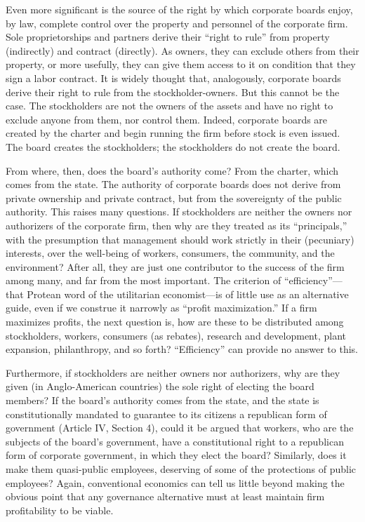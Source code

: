 \documentclass[
]{book}
\begin{document}
Even more significant is the source of the right by which corporate boards enjoy, by law, complete control over the property and personnel of the corporate firm. Sole proprietorships and partners derive their ``right to rule'' from property (indirectly) and contract (directly). As owners, they can exclude others from their property, or more usefully, they can give them access to it on condition that they sign a labor contract. It is widely thought that, analogously, corporate boards derive their right to rule from the stockholder-owners. But this cannot be the case. The stockholders are not the owners of the assets and have no right to exclude anyone from them, nor control them. Indeed, corporate boards are created by the charter and begin running the firm before stock is even issued. The board creates the stockholders; the stockholders do not create the board.

From where, then, does the board's authority come? From the charter, which comes from the state. The authority of corporate boards does not derive from private ownership and private contract, but from the sovereignty of the public authority. This raises many questions. If stockholders are neither the owners nor authorizers of the corporate firm, then why are they treated as its ``principals,'' with the presumption that management should work strictly in their (pecuniary) interests, over the well-being of workers, consumers, the community, and the environment? After all, they are just one contributor to the success of the firm among many, and far from the most important. The criterion of ``efficiency''---that Protean word of the utilitarian economist---is of little use as an alternative guide, even if we construe it narrowly as ``profit maximization.'' If a firm maximizes profits, the next question is, how are these to be distributed among stockholders, workers, consumers (as rebates), research and development, plant expansion, philanthropy, and so forth? ``Efficiency'' can provide no answer to this.

Furthermore, if stockholders are neither owners nor authorizers, why are they given (in Anglo-American countries) the sole right of electing the board members? If the board's authority comes from the state, and the state is constitutionally mandated to guarantee to its citizens a republican form of government (Article IV, Section 4), could it be argued that workers, who are the subjects of the board's government, have a constitutional right to a republican form of corporate government, in which they elect the board? Similarly, does it make them quasi-public employees, deserving of some of the protections of public employees? Again, conventional economics can tell us little beyond making the obvious point that any governance alternative must at least maintain firm profitability to be viable.
\end{document}
